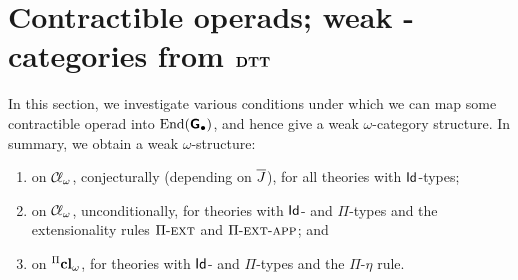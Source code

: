 





 


















\section{Contractible operads; weak \pdfomega-categories from \texorpdfstring{$\mathbf{DTT}$}{DTT}} \label{sec:contractibility}



 In this section, we investigate various conditions under which we can map some contractible operad into $\mathrm{End}(\textsf{\textbf{G}}_\bullet)$, and hence give a weak $\omega$-category structure.  In summary, we obtain a weak $\omega$-structure:
\begin{enumerate}
\item on $\mathcal{C}\! \ell_\omega$, conjecturally (depending on $\overline{J}$), for all theories with $\mathsf{Id}$-types;
\item on $\mathcal{C}\! \ell_\omega$, unconditionally, for theories with $\mathsf{Id}$- and $\Pi$-types and the extensionality rules ${\Pi\mbox{-}\textsc{ext}}$ and ${\Pi\mbox{-}\textsc{ext}\mbox{-}\textsc{app}}$; and
\item on ${}^\Pi \mathbf{cl}_\omega$, for theories with $\mathsf{Id}$- and $\Pi$-types and the $\Pi$-$\eta$ rule.
\end{enumerate}

